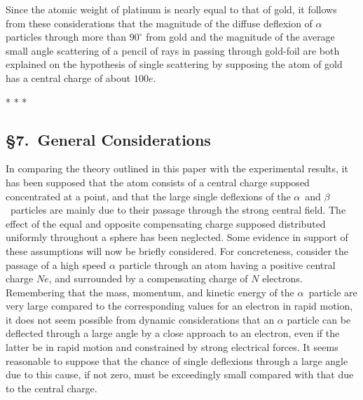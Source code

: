 Since the atomic weight of platinum is nearly equal to that of gold, it
follows from these considerations that the magnitude of the diffuse
deflexion of $\alpha$ particles through more than $90^\circ$ from gold and the
magnitude of the average small angle scattering of a pencil of rays in
passing through gold-foil are both explained on the hypothesis of single
scattering by supposing the atom of gold has a central charge of about
$100e$.\\[5pt]
\centerline{* * *}
%
\subsection*{\S7.\ General Considerations}

In comparing the theory outlined in this paper with the experimental
results, it has been supposed that the atom consists of a central charge
supposed concentrated at a point, and that the large single deflexions
of the $\alpha$~and $\beta$~particles are mainly due to their passage
through the strong central field. The effect of the equal and opposite
compensating charge supposed distributed uniformly throughout a sphere
has been neglected. Some evidence in support of these assumptions will
now be briefly considered. For concreteness, consider the passage of a
high speed $\alpha$ particle through an atom having a positive central
charge $Ne$, and surrounded by a compensating charge of $N$
electrons. Remembering that the mass, momentum, and kinetic energy of
the $\alpha$~particle are very large compared to the corresponding
values for an electron in rapid motion, it does not seem possible from
dynamic considerations that an $\alpha$ particle can be deflected
through a large angle by a close approach to an electron, even if the
latter be in rapid motion and constrained by strong electrical forces.
It seems reasonable to suppose that the chance of single deflexions
through a large angle due to this cause, if not zero, must be
exceedingly small compared with that due to the central charge.

